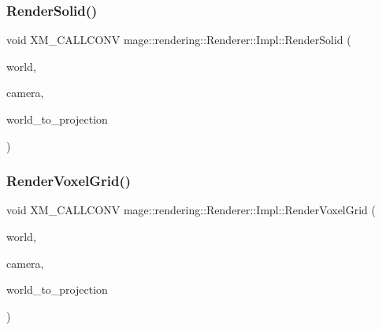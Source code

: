 \subsubsection{\texorpdfstring{Render\+Solid()}{RenderSolid()}}
{\footnotesize\ttfamily void X\+M\+\_\+\+C\+A\+L\+L\+C\+O\+NV mage\+::rendering\+::\+Renderer\+::\+Impl\+::\+Render\+Solid (\begin{DoxyParamCaption}\item[{const \hyperlink{classmage_1_1rendering_1_1_world}{World} \&}]{world,  }\item[{const \hyperlink{classmage_1_1rendering_1_1_camera}{Camera} \&}]{camera,  }\item[{F\+X\+M\+M\+A\+T\+R\+IX}]{world\+\_\+to\+\_\+projection }\end{DoxyParamCaption})\hspace{0.3cm}{\ttfamily [private]}}

\hypertarget{classmage_1_1rendering_1_1_renderer_1_1_impl_adb7265bf1333368a57e5071ef3f56fca}{}\label{classmage_1_1rendering_1_1_renderer_1_1_impl_adb7265bf1333368a57e5071ef3f56fca} 
\subsubsection{\texorpdfstring{Render\+Voxel\+Grid()}{RenderVoxelGrid()}}
{\footnotesize\ttfamily void X\+M\+\_\+\+C\+A\+L\+L\+C\+O\+NV mage\+::rendering\+::\+Renderer\+::\+Impl\+::\+Render\+Voxel\+Grid (\begin{DoxyParamCaption}\item[{const \hyperlink{classmage_1_1rendering_1_1_world}{World} \&}]{world,  }\item[{const \hyperlink{classmage_1_1rendering_1_1_camera}{Camera} \&}]{camera,  }\item[{F\+X\+M\+M\+A\+T\+R\+IX}]{world\+\_\+to\+\_\+projection }\end{DoxyParamCaption})\hspace{0.3cm}{\ttfamily [private]}}

\hypertarget{classmage_1_1rendering_1_1_renderer_1_1_impl_a0886adfdf0f7c7f7d9e8d77a8d429844}{}\label{classmage_1_1rendering_1_1_renderer_1_1_impl_a0886adfdf0f7c7f7d9e8d77a8d429844} 
